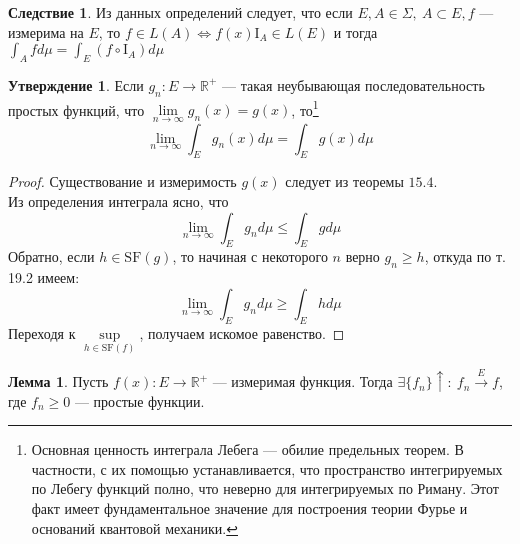 \documentclass[11pt,a4paper]{report}
\def\Real{\mathbb{R}}
\theoremstyle{definition}
\theoremstyle{definition}
\newtheorem{lemma}{Лемма}[section]
\newtheorem{preposition}{Утверждение}[section]
\newtheorem{corollary}{Следствие}[section]
\theoremstyle{definition}
\begin{document}
		\begin{corollary}
			Из данных определений следует, что если $ E, A \in \Sigma,\ A \subset E, f $ — измерима на $ E $, то $ f \in L(A) \iff f(x) \mbox{I}_{A} \in L(E) $ и тогда $ \int_{A} f d\mu = \int_{E} (f \circ \mbox{I}_{A}) d\mu  $
		\end{corollary}
		\begin{preposition}
			Если $ g_{n}: E \to \Real^{+} $ — такая неубывающая последовательность простых функций, что $ \lim\limits_{n \to \infty} g_{n}(x) = g(x) $, то\footnote{Основная ценность интеграла Лебега — обилие предельных теорем. В частности, с их помощью устанавливается, что пространство интегрируемых по Лебегу функций полно, что неверно для интегрируемых по Риману. Этот факт имеет фундаментальное значение для построения теории Фурье и оснований квантовой механики.} 
			\[
				\lim\limits_{n\to\infty} \int_{E} g_{n}(x) d\mu = \int_{E} g(x) d\mu
			\]
		\end{preposition}
		\begin{proof}
			Существование и измеримость $ g(x) $ следует из теоремы $ 15.4 $.\\
			Из определения интеграла ясно, что 
			\[ \lim\limits_{n\to\infty} \int_{E} g_{n} d\mu \le \int_{E} g d\mu \]
			Обратно, если $ h \in \mbox{SF}(g) $, то начиная с некоторого $ n $ верно $ g_{n} \ge h $, откуда по т. 19.2 имеем: 
			\[ \lim\limits_{n\to\infty} \int_{E} g_{n} d\mu \ge \int_{E} h d\mu \]
			Переходя к $ \sup\limits_{h \in \mbox{SF}(f)} $, получаем искомое равенство.
		\end{proof}
		\begin{lemma}
			Пусть $ f(x): E \to \Real^{+} $ — измеримая функция. Тогда $ \exists \{f_{n}\}\uparrow:\ f_{n} \xrightarrow{E} f $, где $ f_{n} \geq 0 $  — простые функции.
		\end{lemma}
\end{document}
